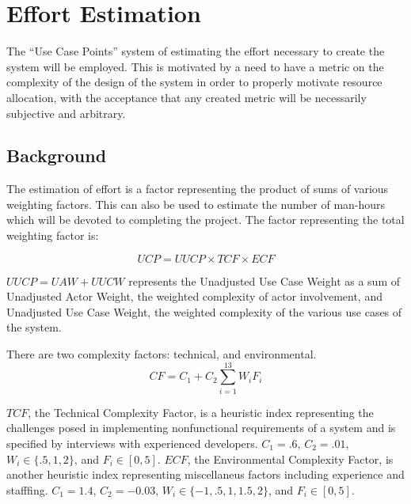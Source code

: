 \chapter{Effort Estimation}
\newcommand{\UCP}{\mathit{UCP}}
\newcommand{\UUCP}{\mathit{UUCP}}
\newcommand{\TCF}{\mathit{TCF}}
\newcommand{\ECF}{\mathit{ECF}}
\newcommand{\UAW}{\mathit{UAW}}
\newcommand{\UUCW}{\mathit{UUCW}}
\newcommand{\CF}{\mathit{CF}}
\newcommand{\PF}{\mathit{PF}}

The ``Use Case Points'' system of estimating the effort necessary 
to create the system will be employed. This is motivated by
a need to have a metric on the complexity of the design of
the system in order to properly motivate resource allocation,
with the acceptance that any created metric will be necessarily
subjective and arbitrary.\cite{marsic}

\section{Background}

The estimation of effort is a factor representing the product of sums
of various weighting factors. This can also be used to estimate the 
number of man-hours which will be devoted to completing the project.
The factor representing the total weighting factor is:

\begin{equation}
\UCP = \UUCP \times \TCF \times \ECF
\end{equation}

$\UUCP = \UAW + \UUCW$ represents the Unadjusted Use Case Weight as a
sum of Unadjusted Actor Weight, the weighted complexity of actor
involvement, and Unadjusted Use Case Weight, the weighted complexity
of the various use cases of the system. 

There are two complexity factors: technical, and environmental.
\begin{equation}
\CF = C_1+C_2\sum_{i=1}^{13}W_iF_i
\end{equation}

$\TCF$, the Technical Complexity Factor, is a heuristic index
representing the challenges posed in implementing nonfunctional
requirements of a system and is
specified by interviews with experienced developers. $C_1 = .6$, 
$C_2 = .01$, $W_i \in \{.5, 1, 2\} $, and $F_i \in [0,5]$. $ECF$,
the Environmental Complexity Factor, is another heuristic index
representing miscellaneus factors including experience and stafffing.
$C_1 = 1.4$, $C_2 = -0.03$, $W_i \in \{-1,.5,1,1.5,2\}$, and 
$F_i \in [0,5]$. 

